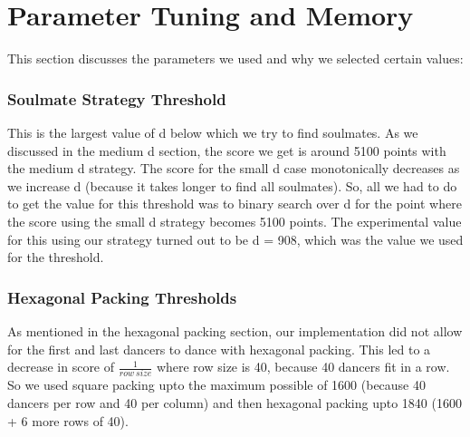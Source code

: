 \section{Parameter Tuning and Memory}
This section discusses the parameters we used and why we selected certain values:\\
\subsubsection{Soulmate Strategy Threshold}
This is the largest value of d below which we try to find soulmates. As we discussed in the medium d section, the score we get is around 5100 points with the medium d strategy. The score for the small d case monotonically decreases as we increase d (because it takes longer to find all soulmates). So, all we had to do to get the value for this threshold was to binary search over d for the point where the score using the small d strategy becomes 5100 points. The experimental value for this using our strategy turned out to be d = 908, which was the value we used for the threshold.\\
\subsubsection{Hexagonal Packing Thresholds}
As mentioned in the hexagonal packing section, our implementation did not allow for the first and last dancers to dance with hexagonal packing. This led to a decrease in score of $\frac{1}{row\ size}$ where row size is 40, because 40 dancers fit in a row. So we used square packing upto the maximum possible of 1600 (because 40 dancers per row and 40 per column) and then hexagonal packing upto 1840 (1600 + 6 more rows of 40).\\
